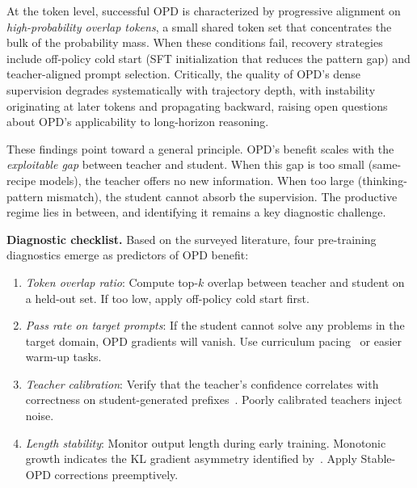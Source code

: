 \documentclass{article} %
\begin{document}
At the token level, successful OPD is characterized by progressive alignment on \emph{high-probability overlap tokens}, a small shared token set that concentrates the bulk of the probability mass. When these conditions fail, recovery strategies include off-policy cold start (SFT initialization that reduces the pattern gap) and teacher-aligned prompt selection. Critically, the quality of OPD's dense supervision degrades systematically with trajectory depth, with instability originating at later tokens and propagating backward, raising open questions about OPD's applicability to long-horizon reasoning.

These findings point toward a general principle. OPD's benefit scales with the \emph{exploitable gap} between teacher and student. When this gap is too small (same-recipe models), the teacher offers no new information. When too large (thinking-pattern mismatch), the student cannot absorb the supervision. The productive regime lies in between, and identifying it remains a key diagnostic challenge.

\textbf{Diagnostic checklist.} Based on the surveyed literature, four pre-training diagnostics emerge as predictors of OPD benefit:
\begin{enumerate}[nosep]
    \item \textit{Token overlap ratio}: Compute top-$k$ overlap between teacher and student on a held-out set. If too low, apply off-policy cold start first.
    \item \textit{Pass rate on target prompts}: If the student cannot solve any problems in the target domain, OPD gradients will vanish. Use curriculum pacing~\citep{2603.11178} or easier warm-up tasks.
    \item \textit{Teacher calibration}: Verify that the teacher's confidence correlates with correctness on student-generated prefixes~\citep{2604.16830}. Poorly calibrated teachers inject noise.
    \item \textit{Length stability}: Monitor output length during early training. Monotonic growth indicates the KL gradient asymmetry identified by~\citet{luo2026demystifying}. Apply Stable-OPD corrections preemptively.
\end{enumerate}
\end{document}
